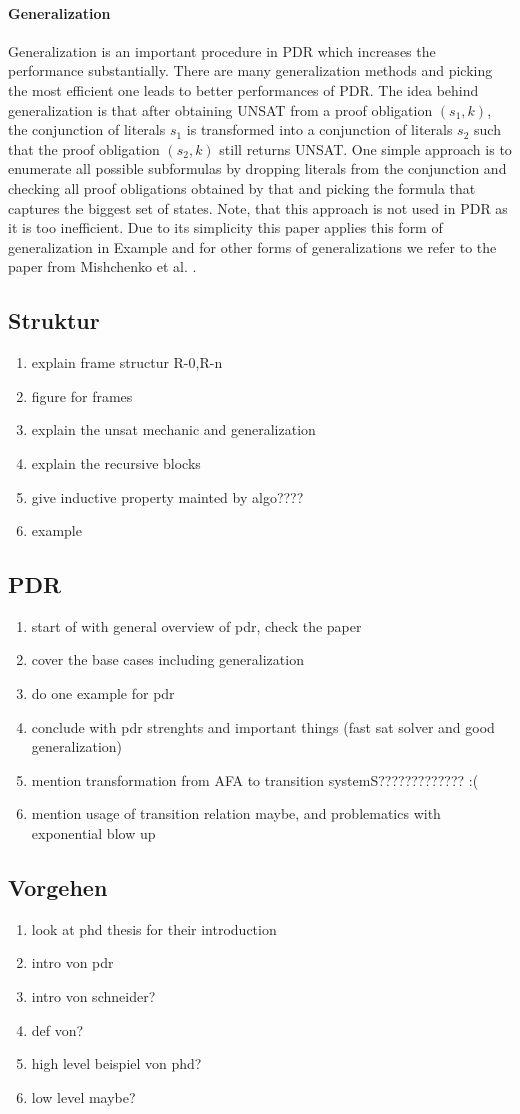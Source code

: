 \paragraph*{Generalization} Generalization is an important procedure in PDR which increases the performance substantially. There are many generalization methods and picking the most efficient one leads to better performances of PDR.
The idea behind generalization is that after obtaining UNSAT from a proof obligation $(s_1,k)$, the conjunction of literals $s_1$ is transformed into a conjunction of literals $s_2$ such that the proof obligation $(s_2,k)$ still returns UNSAT.
One simple approach is to enumerate all possible subformulas by dropping literals from the conjunction and checking all proof obligations obtained by that and picking the formula that captures the biggest set of states.
Note, that this approach is not used in PDR as it is too inefficient.
Due to its simplicity this paper applies this form of generalization in Example  and for other forms of generalizations we refer to the paper from Mishchenko et al. \cite{??}.
\subsection{Struktur}
\begin{enumerate}
\item explain frame structur R-0,R-n
\item figure for frames
\item explain the unsat mechanic and generalization
\item explain the recursive blocks
\item give inductive property mainted by algo????
\item example
\end{enumerate}
\subsection{PDR}
\begin{enumerate}
\item start of with general overview of pdr, check the paper
\item cover the base cases including generalization
\item do one example for pdr
\item conclude with pdr strenghts and important things (fast sat solver and good generalization) 
\item mention transformation from AFA to transition systemS????????????? :(
\item mention usage of transition relation maybe, and problematics with exponential blow up
\end{enumerate}
\subsection{Vorgehen}
\begin{enumerate}
\item look at phd thesis for their introduction
\item intro von pdr
\item intro von schneider?
\item def von?
\item high level beispiel von phd?
\item low level maybe?
\end{enumerate}